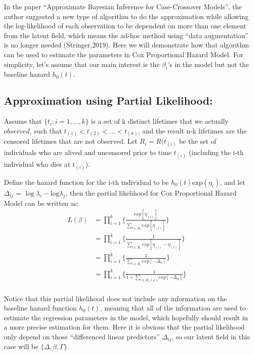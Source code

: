 \documentclass[]{article}
\begin{document}
In the paper ``Approximate Bayesian Inference for Case-Crossover
Models'', the author suggested a new type of algorithm to do the
approximation while allowing the log-likelihood of each observation to
be dependent on more than one element from the latent field, which means
the ad-hoc method using ``data augmentation'' is no longer needed
(Stringer,2019). Here we will demonstrate how that algorithm can be used
to estimate the parameters in Cox Proportional Hazard Model. For
simplicity, let's assume that our main interest is the \(\beta_i\)'s in
the model but not the baseline hazard \(h_0(t)\).

\hypertarget{approximation-using-partial-likelihood}{%
\subsection{Approximation using Partial
Likelihood:}\label{approximation-using-partial-likelihood}}

Assume that \(\{t_i:i=1,...,k\}\) is a set of k distinct lifetimes that
we actually \(observed\), such that
\(t_{(1)} < t_{(2)} < ... <t_{(k)}\), and the result n-k lifetimes are
the censored lifetimes that are not observed. Let \(R_i = R(t_{(i)}\) be
the set of individuals who are alived and uncensored prior to time
\(t_{(i)}\) (including the i-th individual who dies at \(t_{(i)}\)).

Define the hazard function for the i-th individual to be
\(h_0(t)\text{exp}(\eta_i)\), and let \(\Delta_{ij}\) =
\(\log\lambda_i -\text{log} \lambda_j\), then the partial likelihood for
Cox Proportional Hazard Model can be written as:
\begin{equation}\begin{aligned}\label{eqn:partial}
L(\beta) &= \prod_{i=1}^{k} \bigg\{\frac{exp[\eta_{(i)}]}{{\sum_{l\in R_i}^{}exp[\eta_{(l)}]}}\bigg \} \\
         &= \prod_{i=1}^{k} \bigg\{\frac{1}{{\sum_{l\in R_i}^{}exp[\eta_{(l)}-\eta_{(i)}]}}\bigg \} \\
         &= \prod_{i=1}^{k} \bigg\{\frac{1}{{\sum_{l\in R_i}^{}exp[-\Delta_{il}]}}\bigg \} \\
         &= \prod_{i=1}^{k} \bigg\{\frac{1}{{1 + \sum_{l\in R_i , l \neq i}^{}exp[-\Delta_{il}]}}\bigg \} \\
\end{aligned}\end{equation}

Notice that this partial likelihood does not include any information on
the baseline hazard function \(h_0(t)\), meaning that all of the
information are used to estimate the regression parameters in the model,
which hopefully should result in a more precise estimation for them.
Here it is obvious that the partial likelihood only depend on those
``differenced linear predictors'' \(\Delta_{ij}\), so our latent field
in this case will be \(\{ \Delta,\beta,\Gamma \}\).
\end{document}
